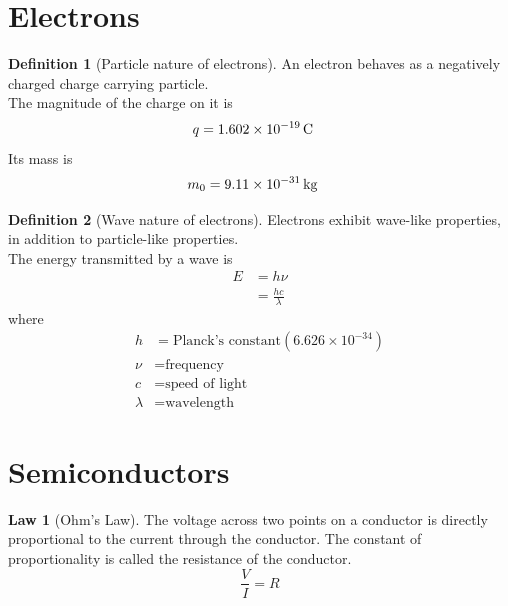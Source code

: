\documentclass[titlepage, fleqn, a4paper, 12pt, twoside]{article}
\theoremstyle{definition}
\newtheorem{definition}{Definition}
\theoremstyle{theorem}
\newtheorem{law}{Law}
\begin{document}
\newpage
\section{Electrons}

\begin{definition}[Particle nature of electrons]
	An electron behaves as a negatively charged charge carrying particle.\\
	The magnitude of the charge on it is
	\begin{align*}
		q & = 1.602 \times 10^{-19} \coulomb
	\end{align*}
	Its mass is
	\begin{align*}
		m_0 & = 9.11 \times 10^{-31} \kilogram
	\end{align*}
\end{definition}

\begin{definition}[Wave nature of electrons]
	Electrons exhibit wave-like properties, in addition to particle-like properties.\\
	The energy transmitted by a wave is
	\begin{align*}
		E & = h \nu \\
                  & = \frac{h c}{\lambda}
	\end{align*}
	where
	\begin{align*}
		h       & = \text{Planck's constant} \left( 6.626 \times 10^{-34} \right) \\
		\nu     & = \text{frequency}                                              \\
		c       & = \text{speed of light}                                         \\
		\lambda & = \text{wavelength}
	\end{align*}
\end{definition}

\section{Semiconductors}

\begin{law}[Ohm's Law]
	The voltage across two points on a conductor is directly proportional to the current through the conductor.
	The constant of proportionality is called the resistance of the conductor.
	\begin{equation*}
		\frac{V}{I} = R
	\end{equation*}
	\label{Ohm's_Law}
\end{law}
\end{document}
